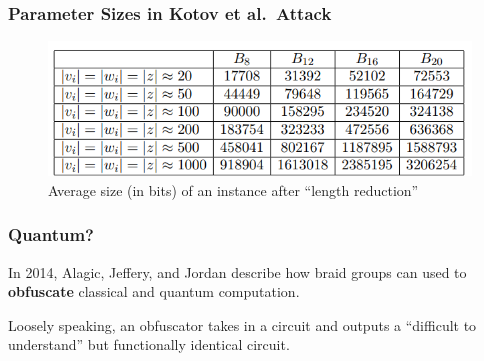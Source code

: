 \documentclass{beamer}
\begin{document}
\begin{frame}
	\frametitle{Parameter Sizes in Kotov et al.\ Attack}
	\begin{figure}[h]
		\centering
		\includegraphics[scale=.5]{bit.png}
		\caption{Average size (in bits) of an instance after ``length reduction''}
	\end{figure}
\end{frame}


\begin{frame}
	\frametitle{Quantum?}
	In 2014, Alagic, Jeffery, and Jordan describe how braid groups can used to \textbf{obfuscate} classical and quantum computation.\pause
	\begin{definition}[Obfuscator]
		Loosely speaking, an obfuscator takes in a circuit and outputs a ``difficult to understand'' but functionally identical circuit.
	\end{definition}
\end{frame}
\end{document}

